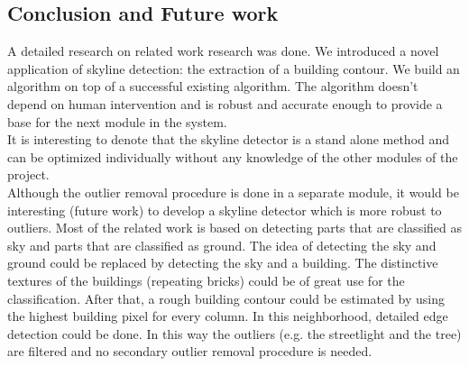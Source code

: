 \subsection{Conclusion and Future work}
A detailed research on related work research was done.
We introduced a novel application of skyline detection: the extraction of a
building contour. We build an algorithm on top of a successful existing
algorithm.  The algorithm doesn't depend on human intervention and is robust and
accurate enough to provide a base for the next module in the system.\\
It is interesting to denote that the skyline detector is a stand alone method and
can be optimized individually without any knowledge of the other modules of the
project.\\

Although the outlier removal procedure is done in a separate module, it would be
interesting (future work) to develop a skyline detector which is more robust to
outliers.  Most of the related work is based on detecting parts that are
classified as sky and parts that are classified as ground. The idea of detecting
the sky and ground could be replaced by detecting the sky and a building. The
distinctive textures of the buildings (repeating bricks) could be of great use
for the classification.  After that, a rough building contour could be estimated
	by using the highest building pixel for every column. In this neighborhood,
	detailed edge detection could be done. In this way the outliers (e.g. the
	streetlight and the tree) are filtered and no secondary outlier removal
	procedure is needed.


